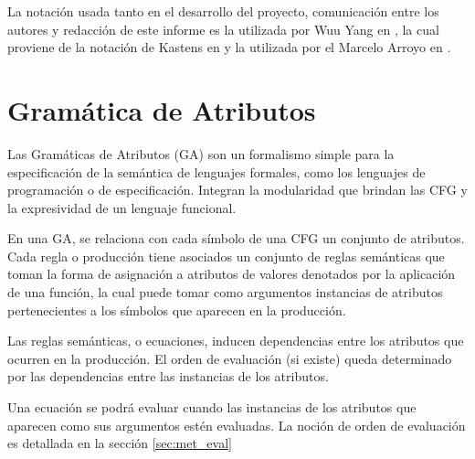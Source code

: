 La notación usada tanto en el desarrollo del proyecto, comunicación entre los autores y redacción de este informe es la utilizada por Wuu Yang en \cite{wuu-yang1}, la cual proviene de la notación de Kastens en \cite{kastens} y la utilizada por el Marcelo Arroyo en \cite{tesismarcelo}.

\section{Gramática de Atributos}

Las Gramáticas de Atributos (GA) son un formalismo simple para la especificación de la semántica de lenguajes formales, como los lenguajes de programación o de especificación. Integran la modularidad que brindan las CFG y la expresividad de un lenguaje funcional.

En una GA, se relaciona con cada símbolo de una CFG un conjunto de atributos. Cada regla o producción tiene asociados un conjunto de reglas semánticas que toman la forma de asignación a atributos de valores denotados por la aplicación de una función, la cual puede tomar como argumentos instancias de atributos pertenecientes a los símbolos que aparecen en la producción.

Las reglas semánticas, o ecuaciones, inducen dependencias entre los atributos que ocurren en la producción. El orden de evaluación (si existe) queda determinado por las dependencias entre las instancias de los atributos.

Una ecuación se podrá evaluar cuando las instancias de los atributos que aparecen como sus argumentos estén evaluadas. La noción de orden de evaluación es detallada en la sección \ref{sec:met_eval}

